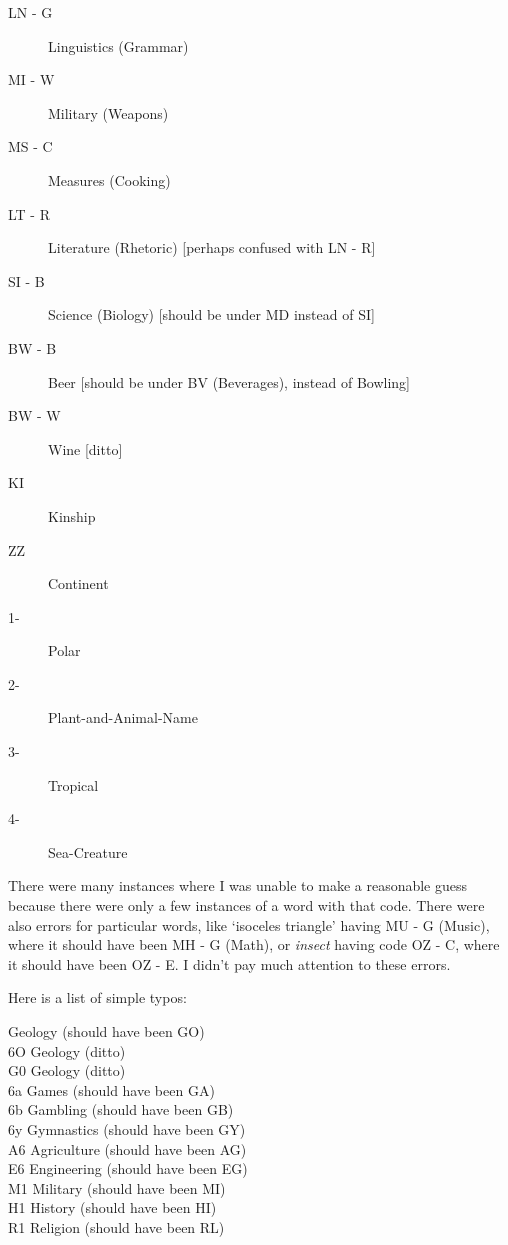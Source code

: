 \begin{description}
\item [LN - G]    Linguistics (Grammar) 
\item [MI - W]    Military (Weapons) 
\item [MS - C]    Measures (Cooking) 
\item [LT - R]    Literature (Rhetoric) [perhaps confused with LN - R] 
\item [SI - B]    Science (Biology) [should be under MD instead of SI] 
\item [BW - B]    Beer [should be under BV (Beverages), instead of Bowling] 
\item [BW - W]    Wine [ditto] 

\medskip

\noindent
\item [KI]        Kinship 
\item [ZZ]        Continent 
\item [1-]        Polar 
\item [2-]        Plant-and-Animal-Name 
\item [3-]        Tropical 
\item [4-]        Sea-Creature 

\end{description}

There were many instances where I was unable to make a reasonable guess
because there were only a few instances of a word with that code.
There were also errors for particular words, like `isoceles 
triangle' having MU - G (Music), where it should have
been MH - G (Math), or {\it insect} having code OZ - C, where it should have
been OZ - E.  I didn't pay much attention to these errors.  


Here is a list of simple typos: \\
\smallskip

  Geology  (should have been GO) \\
6O  Geology  (ditto) \\
G0  Geology  (ditto) \\
6a  Games    (should have been GA) \\
6b  Gambling (should have been GB) \\
6y  Gymnastics (should have been GY) \\
A6  Agriculture (should have been AG) \\
E6  Engineering (should have been EG) \\
M1  Military (should have been MI) \\
H1  History (should have been HI) \\
R1  Religion (should have been RL) \\




